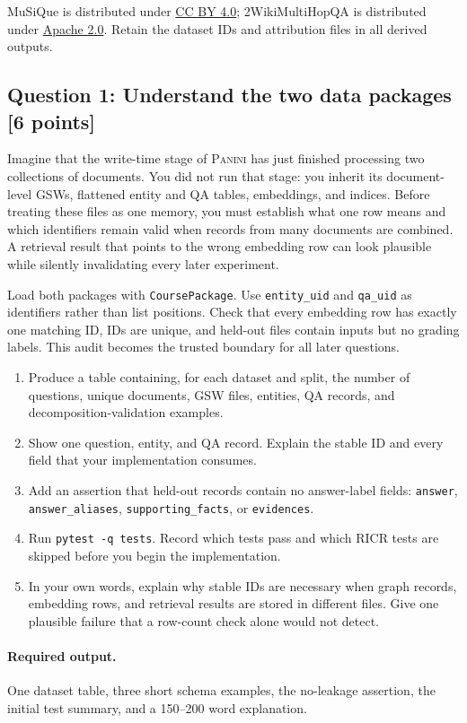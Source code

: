 \documentclass[11pt]{article}
\newcommand{\code}[1]{\texttt{#1}}
\newcommand{\PANINI}{{\mdseries\textsc{Panini}}\xspace}
\newcommand{\question}[3]{%
  \subsection[Question #1: #2 (#3 points)]{Question #1: #2 \hfill [#3 points]}%
}
\newcommand{\deliverables}{\paragraph{Required output.}}
\begin{document}
MuSiQue is distributed under
\href{https://github.com/stonybrooknlp/musique}{CC BY 4.0}; 2WikiMultiHopQA is
distributed under
\href{https://github.com/Alab-NII/2wikimultihop}{Apache 2.0}. Retain the
dataset IDs and attribution files in all derived outputs.

\question{1}{Understand the two data packages}{6}

Imagine that the write-time stage of \PANINI has just finished processing two
collections of documents. You did not run that stage: you inherit its
document-level GSWs, flattened entity and QA tables, embeddings, and indices.
Before treating these files as one memory, you must establish what one row
means and which identifiers remain valid when records from many documents are
combined. A retrieval result that points to the wrong embedding row can look
plausible while silently invalidating every later experiment.

Load both packages with \code{CoursePackage}. Use \code{entity\_uid} and
\code{qa\_uid} as identifiers rather than list positions. Check that every
embedding row has exactly one matching ID, IDs are unique, and held-out files
contain inputs but no grading labels. This audit becomes the trusted boundary
for all later questions.

\begin{enumerate}[label=(\alph*)]
  \item Produce a table containing, for each dataset and split, the number of
        questions, unique documents, GSW files, entities, QA records, and
        decomposition-validation examples.
  \item Show one question, entity, and QA record. Explain the stable ID and
        every field that your implementation consumes.
  \item Add an assertion that held-out records contain no answer-label fields:
        \code{answer}, \code{answer\_aliases},
        \code{supporting\_facts}, or \code{evidences}.
  \item Run \code{pytest -q tests}. Record which tests pass and which RICR
        tests are skipped before you begin the implementation.
  \item In your own words, explain why stable IDs are necessary when graph
        records, embedding rows, and retrieval results are stored in different
        files. Give one plausible failure that a row-count check alone would
        not detect.
\end{enumerate}

\deliverables One dataset table, three short schema examples, the no-leakage
assertion, the initial test summary, and a 150--200 word explanation.
\end{document}
